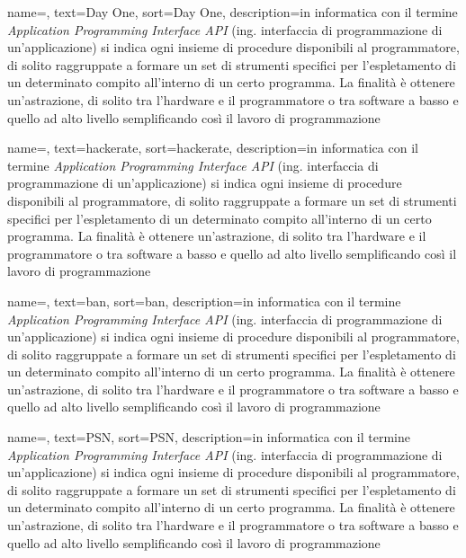{
	name=,
	text=Day One,
	sort=Day One,
	description={in informatica con il termine \emph{Application Programming Interface API} (ing. interfaccia di programmazione di un'applicazione) si indica ogni insieme di procedure disponibili al programmatore, di solito raggruppate a formare un set di strumenti specifici per l'espletamento di un determinato compito all'interno di un certo programma. La finalità è ottenere un'astrazione, di solito tra l'hardware e il programmatore o tra software a basso e quello ad alto livello semplificando così il lavoro di programmazione}
}

{
	name=,
	text=hackerate,
	sort=hackerate,
	description={in informatica con il termine \emph{Application Programming Interface API} (ing. interfaccia di programmazione di un'applicazione) si indica ogni insieme di procedure disponibili al programmatore, di solito raggruppate a formare un set di strumenti specifici per l'espletamento di un determinato compito all'interno di un certo programma. La finalità è ottenere un'astrazione, di solito tra l'hardware e il programmatore o tra software a basso e quello ad alto livello semplificando così il lavoro di programmazione}
}

{
	name=,
	text=ban,
	sort=ban,
	description={in informatica con il termine \emph{Application Programming Interface API} (ing. interfaccia di programmazione di un'applicazione) si indica ogni insieme di procedure disponibili al programmatore, di solito raggruppate a formare un set di strumenti specifici per l'espletamento di un determinato compito all'interno di un certo programma. La finalità è ottenere un'astrazione, di solito tra l'hardware e il programmatore o tra software a basso e quello ad alto livello semplificando così il lavoro di programmazione}
}

{
	name=,
	text=PSN,
	sort=PSN,
	description={in informatica con il termine \emph{Application Programming Interface API} (ing. interfaccia di programmazione di un'applicazione) si indica ogni insieme di procedure disponibili al programmatore, di solito raggruppate a formare un set di strumenti specifici per l'espletamento di un determinato compito all'interno di un certo programma. La finalità è ottenere un'astrazione, di solito tra l'hardware e il programmatore o tra software a basso e quello ad alto livello semplificando così il lavoro di programmazione}
}

